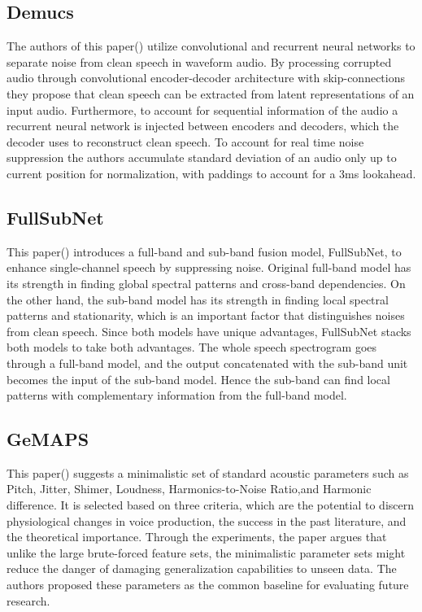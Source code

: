 \documentclass[11pt]{article}
\begin{document}
\subsection{Demucs}

The authors of this paper(\cite{Demucs}) utilize convolutional and recurrent neural networks to separate noise from clean speech in waveform audio. By processing corrupted audio through convolutional encoder-decoder architecture with skip-connections they propose that clean speech can be extracted from latent representations of an input audio. Furthermore, to account for sequential information of the audio a recurrent neural network is injected between encoders and decoders, which the decoder uses to reconstruct clean speech. To account for real time noise suppression the authors accumulate standard deviation of an audio only up to current position for normalization, with paddings to account for a 3ms lookahead.

\subsection{FullSubNet}

This paper(\cite{fullsubnet}) introduces a full-band and sub-band fusion model, FullSubNet, to enhance single-channel speech by suppressing noise. Original full-band model has its strength in finding global spectral patterns and cross-band dependencies. On the other hand, the sub-band model has its strength in finding local spectral patterns and stationarity, which is an important factor that distinguishes noises from clean speech. Since both models have unique advantages, FullSubNet stacks both models to take both advantages. The whole speech spectrogram goes through a full-band model, and the output concatenated with the sub-band unit becomes the input of the sub-band model. Hence the sub-band can find local patterns with complementary information from the full-band model. 

\subsection{GeMAPS}

This paper(\cite{GeMAPS}) suggests a minimalistic set of standard acoustic parameters such as Pitch, Jitter, Shimer, Loudness, Harmonics-to-Noise Ratio,and Harmonic difference. It is selected based on three criteria, which are the potential to discern physiological changes in voice production, the success in the past literature, and the theoretical importance. Through the experiments, the paper argues that unlike the large brute-forced feature sets, the minimalistic parameter sets might reduce the danger of damaging generalization capabilities to unseen data. The authors proposed these parameters as the common baseline for evaluating future research.
\end{document}
